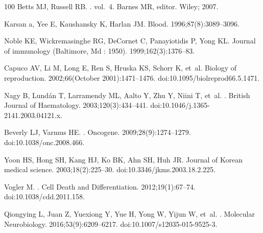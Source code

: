 \documentclass[10pt,letterpaper]{article}
\begin{document}
\begin{thebibliography}{100}
Betts MJ, Russell RB.
. vol.~4.
\newblock Barnes MR, editor. Wiley; 2007.

Karsan a, Yee E, Kaushansky K, Harlan JM.
\newblock Blood. 1996;87(8):3089--3096.

Noble KE, Wickremasinghe RG, DeCornet C, Panayiotidis P, Yong KL.
\newblock Journal of immunology (Baltimore, Md : 1950). 1999;162(3):1376--83.

Capuco AV, Li M, Long E, Ren S, Hruska KS, Schorr K, et~al.
\newblock Biology of reproduction. 2002;66(October 2001):1471--1476.
\newblock doi:{10.1095/biolreprod66.5.1471}.

Nagy B, Lund{\'{a}}n T, Larramendy ML, Aalto Y, Zhu Y, Niini T, et~al.
.
\newblock British Journal of Haematology. 2003;120(3):434--441.
\newblock doi:{10.1046/j.1365-2141.2003.04121.x}.

Beverly LJ, Varmus HE.
.
\newblock Oncogene. 2009;28(9):1274--1279.
\newblock doi:{10.1038/onc.2008.466}.

Yoon HS, Hong SH, Kang HJ, Ko BK, Ahn SH, Huh JR.
\newblock Journal of Korean medical science. 2003;18(2):225--30.
\newblock doi:{10.3346/jkms.2003.18.2.225}.

Vogler M.
.
\newblock Cell Death and Differentiation. 2012;19(1):67--74.
\newblock doi:{10.1038/cdd.2011.158}.

Qiongying L, Juan Z, Yuexiong Y, Yue H, Yong W, Yijun W, et~al.
.
\newblock Molecular Neurobiology. 2016;53(9):6209--6217.
\newblock doi:{10.1007/s12035-015-9525-3}.


\end{thebibliography}
\end{document}
